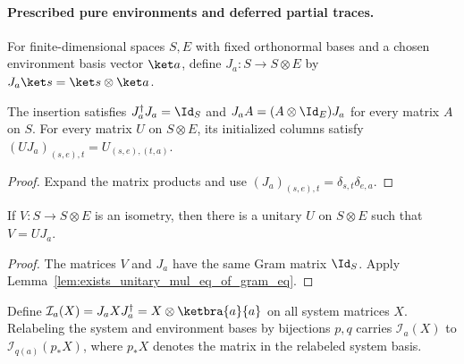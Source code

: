 \paragraph{Prescribed pure environments and deferred partial traces.}

\begin{definition}
    \label{def:fixed_environment_insertion}
    \leanok
    For finite-dimensional spaces $S,E$ with fixed orthonormal bases and a
    chosen environment basis vector $\ket a$, define
    $J_a:S\to S\otimes E$ by $J_a\ket s=\ket s\otimes\ket a$.
\end{definition}

\begin{theorem}
    \label{thm:fixed_environment_insertion}
    \leanok
    The insertion satisfies $J_a^\dagger J_a=\Id_S$ and
    $J_aA=(A\otimes\Id_E)J_a$ for every matrix $A$ on $S$.
    For every matrix $U$ on $S\otimes E$, its initialized columns satisfy
    $(UJ_a)_{(s,e),t}=U_{(s,e),(t,a)}$.
\end{theorem}
\begin{proof}\leanok
    Expand the matrix products and use
    $(J_a)_{(s,e),t}=\delta_{s,t}\delta_{e,a}$.
\end{proof}

\begin{theorem}
    \label{thm:fixed_environment_unitary_extension}
    \leanok
    If $V:S\to S\otimes E$ is an isometry, then there is a unitary $U$ on
    $S\otimes E$ such that $V=UJ_a$.
\end{theorem}
\begin{proof}\leanok
    The matrices $V$ and $J_a$ have the same Gram matrix $\Id_S$.
    Apply Lemma~\ref{lem:exists_unitary_mul_eq_of_gram_eq}.
\end{proof}

\begin{definition}
    \label{def:pure_environment_initialization}
    \leanok
    Define $\mathcal I_a(X)=J_aXJ_a^\dagger
        =X\otimes\ketbra{a}{a}$ on all system matrices $X$.
    Relabeling the system and environment bases by bijections $p,q$
    carries $\mathcal I_a(X)$ to $\mathcal I_{q(a)}(p_*X)$, where $p_*X$
    denotes the matrix in the relabeled system basis.
\end{definition}

